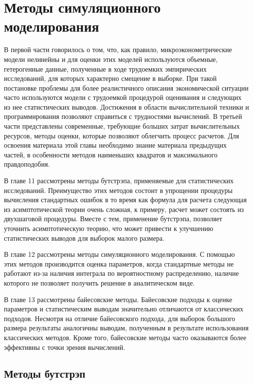
\part{Методы симуляционного моделирования}

В первой части говорилось о том, что, как правило, микроэконометрические модели нелинейны и для оценки этих моделей используются объемные, гетерогенные данные, полученные в ходе трудоемких эмпирических исследований, для которых характерно смещение в выборке. При такой постановке проблемы для более реалистичного описания экономической ситуации часто используются модели с трудоемкой процедурой оценивания и следующих из нее статистических выводов. Достижения в области вычислительной техники и программирования позволяют справиться с трудностями вычислений. В третьей части представлены современные, требующие больших затрат вычислительных ресурсов, методы оценки, которые позволяют облегчить процесс расчетов. Для освоения материала этой главы необходимо знание материала предыдущих частей, в особенности методов наименьших квадратов и максимального правдоподобия.

В главе 11 рассмотрены методы бутстрэпа, применяемые для статистических исследований. Преимущество этих методов состоит в упрощении процедуры вычисления стандартных ошибок в то время как формула для расчета следующая из асимптотической теории очень сложная, к примеру, расчет может состоять из двухшаговой процедуры. Вместе с тем, применение бутстрэпа, позволяет уточнить асимптотическую теорию, что может привести к улучшению статистических выводов для выборок малого размера.

В главе 12 рассмотрены методы симуляционного моделирования. С помощью этих методов производится оценка параметров, когда стандартные методы не работают из-за наличия интеграла по вероятностному распределению, наличие которого не позволяет получить решение в аналитическом виде.

В главе 13 рассмотрены байесовские методы. Байесовские подходы к оценке параметров и статистическим выводам значительно отличаются от классических подходов. Несмотря на отличие байесовского подхода, для выборок большого размера результаты аналогичны выводам, полученным в результате использования классических методов. Кроме того, байесовские методы часто оказываются более эффективны с точки зрения вычислений.


\chapter{Методы бутстрэп}
